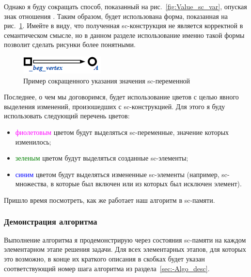 Однако я буду сокращать способ, показанный на
рис.~\ref{fig:Value_sc_var}, опуская знак отношения
. Таким образом, будет использована форма, показанная на
рис.~\ref{fig:Short_value_sc_var}. Имейте в виду, что полученная
sc-конструкция не является корректной в семантическом смысле, но в
данном разделе использование именно такой формы позволит сделать
рисунки более понятными.

\begin{figure}[h!]
  \centering
  \includegraphics{images/3/Short_value_sc_var}
  \caption{Пример сокращенного указания значения sc-переменной
    }
  \label{fig:Short_value_sc_var}
\end{figure}

Последнее, о чем мы договоримся, будет использование цветов с целью
явного выделения изменений, произошедших с sc-конструкцией. Для этого
я буду использовать следующий перечень цветов:

\begin{itemize}
\item \textcolor{magenta}{фиолетовым} цветом будут выделяться sc-переменные, значение
  которых изменилось;
\item \textcolor{green}{зеленым} цветом будут выделяться созданные sc-элементы;
\item \textcolor{blue}{синим} цветом будут выделяться измененные sc-элементы (например,
  sc-множества, в которые был включен или из которых был исключен
  элемент).
\end{itemize}

Пришло время посмотреть, как же работает наш алгоритм в sc-памяти.

\subsubsection{Демонстрация алгоритма}

Выполнение алгоритма я продемонстрирую через состояния sc-памяти на
каждом элементарном этапе решения задачи. Для всех элементарных
этапов, для которых это возможно, в конце их краткого описания в
скобках будет указан соответствующий номер шага алгоритма из
раздела~\ref{sec:-Algo_desc}.

\newenvironment{algostep}[3]
{
  \newpage
  \emph{\textbf{#1}}

  \begin{figure}[h!]
    \centering
    \texttt{[image: images/3/\#2]}
    \label{fig:#2}
  \end{figure}
}
{
}

